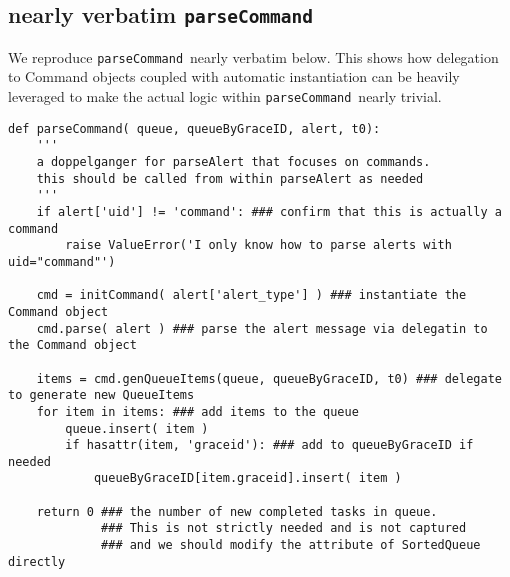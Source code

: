 \documentclass{article}
\newcommand{\parseCommand}{\texttt{parseCommand}}
\begin{document}

\subsection{nearly verbatim \parseCommand}
\label{sec: verbatim parseCommand}

We reproduce \parseCommand~nearly verbatim below.
This shows how delegation to Command objects coupled with automatic instantiation can be heavily leveraged to make the actual logic within \parseCommand~nearly trivial.

\begin{verbatim}
def parseCommand( queue, queueByGraceID, alert, t0):
    '''
    a doppelganger for parseAlert that focuses on commands.
    this should be called from within parseAlert as needed
    '''
    if alert['uid'] != 'command': ### confirm that this is actually a command
        raise ValueError('I only know how to parse alerts with uid="command"')

    cmd = initCommand( alert['alert_type'] ) ### instantiate the Command object
    cmd.parse( alert ) ### parse the alert message via delegatin to the Command object

    items = cmd.genQueueItems(queue, queueByGraceID, t0) ### delegate to generate new QueueItems
    for item in items: ### add items to the queue
        queue.insert( item )
        if hasattr(item, 'graceid'): ### add to queueByGraceID if needed
            queueByGraceID[item.graceid].insert( item )

    return 0 ### the number of new completed tasks in queue. 
             ### This is not strictly needed and is not captured 
             ### and we should modify the attribute of SortedQueue directly
\end{verbatim}




\end{document}
